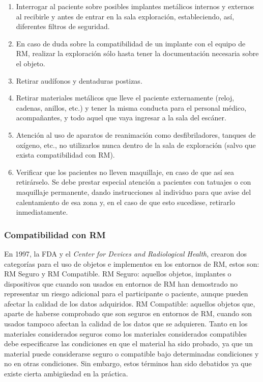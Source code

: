 \begin{enumerate}
\item Interrogar al paciente sobre posibles implantes metálicos internos y externos al recibirle y antes de entrar en la sala exploración, estableciendo, así, diferentes filtros de seguridad.
\item En caso de duda sobre la compatibilidad de un implante con el equipo de RM, realizar la exploración sólo hasta tener la documentación necesaria sobre el objeto.
\item Retirar audífonos y dentaduras postizas.
\item Retirar materiales metálicos que lleve el paciente externamente (reloj, cadenas, anillos, etc.) y tener la misma conducta para el personal médico, acompañantes, y todo aquel que vaya ingresar a la sala del escáner.
\item Atención al uso de aparatos de reanimación como desfibriladores, tanques de oxígeno, etc., no utilizarlos nunca dentro de la sala de exploración (salvo que exista compatibilidad con RM).
\item Verificar que los pacientes no lleven maquillaje, en caso de que así sea retirárselo. Se debe prestar especial atención a pacientes con tatuajes o con maquillaje permanente, dando instrucciones al individuo para que avise del calentamiento de esa zona y, en el caso de que esto sucediese, retirarlo inmediatamente.
\end{enumerate}



\subsubsection{Compatibilidad con RM}
En 1997, la FDA  y el \emph{Center for Devices and Radiological Health}, crearon dos categorías para el uso de objetos e implementos en los entornos de RM, estos son: RM Seguro y RM Compatible. RM Seguro: aquellos objetos, implantes o dispositivos que cuando son usados en entornos de RM han demostrado no  representar un riesgo adicional para el participante o paciente, aunque pueden afectar la calidad de los datos adquiridos. RM Compatible: aquellos objetos que, aparte de haberse comprobado que son seguros en entornos de RM, cuando son usados tampoco afectan la calidad de los datos que se adquieren. Tanto en los materiales considerados seguros como los materiales considerados compatibles debe especificarse las condiciones en que el material ha sido probado, ya que un material puede considerarse seguro o compatible bajo determinadas condiciones y no en otras condiciones. Sin embargo, estos términos han sido debatidos ya que existe cierta ambigüedad en la práctica. 

